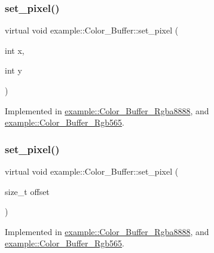 \mbox{\label{classexample_1_1_color___buffer_a967ea326ec0889a36db523727a8154b5}} 
\subsubsection{\texorpdfstring{set\_pixel()}{set\_pixel()}\hspace{0.1cm}{\footnotesize\ttfamily [1/2]}}
{\footnotesize\ttfamily virtual void example\+::\+Color\+\_\+\+Buffer\+::set\+\_\+pixel (\begin{DoxyParamCaption}\item[{int}]{x,  }\item[{int}]{y }\end{DoxyParamCaption})\hspace{0.3cm}{\ttfamily [pure virtual]}}



Implemented in \mbox{\hyperlink{classexample_1_1_color___buffer___rgba8888_aceb94fbc6797177c5a401f4d10d56766}{example\+::\+Color\+\_\+\+Buffer\+\_\+\+Rgba8888}}, and \mbox{\hyperlink{classexample_1_1_color___buffer___rgb565_a0f3e81af58dbe0b6456c239b24221baa}{example\+::\+Color\+\_\+\+Buffer\+\_\+\+Rgb565}}.

\mbox{\label{classexample_1_1_color___buffer_a1c919e629ef74e418e1ad416d0a5e85a}} 
\subsubsection{\texorpdfstring{set\_pixel()}{set\_pixel()}\hspace{0.1cm}{\footnotesize\ttfamily [2/2]}}
{\footnotesize\ttfamily virtual void example\+::\+Color\+\_\+\+Buffer\+::set\+\_\+pixel (\begin{DoxyParamCaption}\item[{size\+\_\+t}]{offset }\end{DoxyParamCaption})\hspace{0.3cm}{\ttfamily [pure virtual]}}



Implemented in \mbox{\hyperlink{classexample_1_1_color___buffer___rgba8888_ac741fa7bca9b980a475e6f7033b64347}{example\+::\+Color\+\_\+\+Buffer\+\_\+\+Rgba8888}}, and \mbox{\hyperlink{classexample_1_1_color___buffer___rgb565_a53f9763360ddbb788e0dfa0ec5a0a9f9}{example\+::\+Color\+\_\+\+Buffer\+\_\+\+Rgb565}}.



